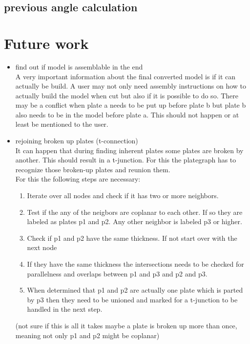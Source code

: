 \documentclass[../ClassicThesis.tex]{subfiles}
\begin{document}
\subsection{previous angle calculation}

\section{Future work}
\begin{itemize}
    \item find out if model is assemblable in the end\\
    A very important information about the final converted model is if it can actually be build. A user may not only need assembly instructions on how to actually build the model when cut but also if it is possible to do so. There may be a conflict when plate a needs to be put up before plate b but plate b also needs to be in the model before plate a. This should not happen or at least be mentioned to the user.
    \item rejoining broken up plates (t-connection)\\
    It can happen that during finding inherent plates some plates are broken by another. This should result in a t-junction. For this the plategraph has to recognize those broken-up plates and reunion them. \\
    For this the following steps are necessary:
    \begin{enumerate}
        \item Iterate over all nodes and check if it has two or more neighbors. 
        \item Test if the any of the neigbors are coplanar to each other. If so they are labeled as plates p1 and p2. Any other neighbor is labeled p3 or higher.
        \item Check if p1 and p2 have the same thickness. If not start over with the next node
        \item If they have the same thickness the intersections needs to be checked for parallelness and overlaps between p1 and p3 and p2 and p3.
        \item When determined that p1 and p2 are actually one plate which is parted by p3 then they need to be unioned and marked for a t-junction to be handled in the next step.
    \end{enumerate}
    (not sure if this is all it takes maybe a plate is broken up more than once, meaning not only p1 and p2 might be coplanar)
\end{itemize}
\end{document}
